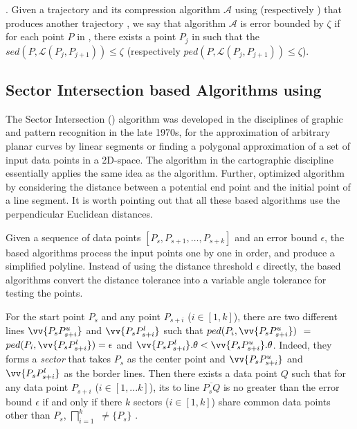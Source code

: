 . Given a trajectory  and its compression  algorithm $\mathcal{A}$ using \sed (respectively \ped) that produces another trajectory ,
we say that algorithm $\mathcal{A}$ is error bounded by $\zeta$ if  for each point $P$ in , there exists a point $P_j$ in  such that the  $sed(P, \mathcal{L}(P_j,P_{j+1}))\le \zeta$ (respectively $ped(P, \mathcal{L}(P_j,P_{j+1}))\le \zeta$).






\subsection{Sector Intersection based Algorithms using \ped}
\label{sub-ci-ped}


The Sector Intersection (\cia) algorithm \cite{Williams:Longest, Sklansky:Cone} was developed in the disciplines of graphic and pattern recognition in the late 1970s, for the approximation of arbitrary planar curves by linear segments or finding a polygonal approximation of a set of input data points in a 2D-space. The \sleeve algorithm \cite{Zhao:Sleeve} in the cartographic discipline essentially applies the same idea as the \cia algorithm.
Further, \cite{Dunham:Cone}  optimized algorithm \cia by considering the distance between a potential end point and the initial point of a line segment. It is worth pointing out that all these \cia based algorithms use the perpendicular Euclidean distances.


Given a sequence of data points $[P_{s}, P_{s+1}, \ldots, P_{s+k}]$ and an error bound $\epsilon$, the \cia based algorithms process the input points one by one in order, and produce a simplified polyline.  Instead of using the distance threshold $\epsilon$ directly, the \cia based algorithms convert the distance tolerance into a variable angle tolerance for testing the points.

For the start point $P_s$ and any point $P_{s+i}$ ($i\in[1, k]$), there are two different lines $\vv{P_sP^u_{s+i}}$ and $\vv{P_sP^l_{s+i}}$ such that $ped(P_i, \vv{P_sP^u_{s+i}})$ $=$ $ped(P_i, \vv{P_sP^l_{s+i}}) = \epsilon$ and $\vv{P_sP^l_{s+i}}.\theta < \vv{P_sP^u_{s+i}}.\theta$. Indeed, they forms a \emph{sector}  that takes $P_s$ as the center point and $\vv{P_sP^u_{s+i}}$ and $\vv{P_sP^l_{s+i}}$ as the border lines.
Then there exists a data point $Q$ such that for any data point $P_{s+i}$ ($i \in [1, ... k]$), its \ped to
line $\overline{P_sQ}$ is no greater than the error bound $\epsilon$ if and only if there $k$ sectors  ($i\in[1,k]$) share common data points other than $P_s$, \ie $\bigsqcap_{i=1}^{k}$ $\ne \{P_s\}$ \cite{Williams:Longest, Sklansky:Cone,Zhao:Sleeve}.

